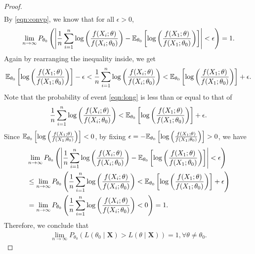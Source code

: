 \begin{proof}
\begin{align*}
\end{align*}
By \cref{eqn:convp}, we know that for all $\epsilon > 0$,
\begin{align*}
\lim_{n\to\infty}P_{\theta_0}\left( \left| \frac{1}{n}\sum_{i=1}^n\log\left( \frac{f(X_i;\theta)}{f(X_i;\theta_0)} \right) - \mathbb{E}_{\theta_0}\left[ \log \left( \frac{f(X_1; \theta)}{f(X_1; \theta_0)} \right) \right] \right| < \epsilon \right) = 1.
\end{align*}
Again by rearranging the inequality inside, we get
\begin{align}
\mathbb{E}_{\theta_0}\left[ \log \left( \frac{f(X_1; \theta)}{f(X_1; \theta_0)} \right) \right] - \epsilon < \frac{1}{n}\sum_{i=1}^n\log\left( \frac{f(X_i;\theta)}{f(X_i;\theta_0)} \right) < \mathbb{E}_{\theta_0}\left[ \log \left( \frac{f(X_1; \theta)}{f(X_1; \theta_0)} \right) \right] + \epsilon. \label{eqn:long}
\end{align}
Note that the probability of event \cref{eqn:long} is less than or equal to that of
\begin{align*}
\frac{1}{n}\sum_{i=1}^n\log\left( \frac{f(X_i;\theta)}{f(X_i;\theta_0)} \right) < \mathbb{E}_{\theta_0}\left[ \log \left( \frac{f(X_1; \theta)}{f(X_1; \theta_0)} \right) \right] + \epsilon.
\end{align*}
Since $\mathbb{E}_{\theta_0}\left[ \log \left( \frac{f(X_1; \theta)}{f(X_1; \theta_0)} \right) \right] < 0$, by fixing $\epsilon = -\mathbb{E}_{\theta_0}\left[ \log \left( \frac{f(X_1; \theta)}{f(X_1; \theta_0)} \right) \right] > 0$, we have
\begin{align*}
&\lim_{n\to\infty}P_{\theta_0}\left( \left| \frac{1}{n}\sum_{i=1}^n\log\left( \frac{f(X_i;\theta)}{f(X_i;\theta_0)} \right) - \mathbb{E}_{\theta_0}\left[ \log \left( \frac{f(X_1; \theta)}{f(X_1; \theta_0)} \right) \right] \right| < \epsilon \right)\\
&\leq \lim_{n\to\infty}P_{\theta_0}\left( \frac{1}{n}\sum_{i=1}^n\log\left( \frac{f(X_i;\theta)}{f(X_i;\theta_0)} \right) < \mathbb{E}_{\theta_0}\left[ \log \left( \frac{f(X_1; \theta)}{f(X_1; \theta_0)} \right) \right] + \epsilon \right)\\
&= \lim_{n\to\infty}P_{\theta_0}\left( \frac{1}{n}\sum_{i=1}^n\log\left( \frac{f(X_i;\theta)}{f(X_i;\theta_0)} \right) < 0 \right) = 1.
\end{align*}
Therefore, we conclude that
\begin{align*}
\lim_{n\to\infty} P_{\theta_0}\left( L(\theta_0 \mid \bm{X}) > L(\theta \mid \bm{X}) \right) = 1, \forall \theta \neq \theta_0.
\end{align*}
\end{proof}
